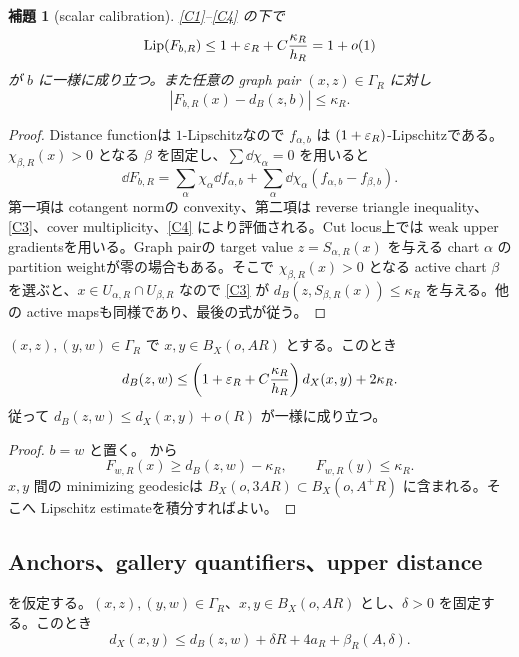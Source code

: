 \documentclass[11pt,a4paper]{ltjsarticle}
\theoremstyle{plain}
\newtheorem{lemma}[theorem]{補題}\newtheorem{corollary}[theorem]{系}
\theoremstyle{definition}
\theoremstyle{remark}
\begin{document}
\begin{lemma}[scalar calibration]\label{lem:scalar-calibration}
\ref{C1}--\ref{C4} の下で
\[
 \operatorname{Lip}(F_{b,R})\le1+\varepsilon_R+C\frac{\kappa_R}{h_R}=1+o(1)
\]
が $b$ に一様に成り立つ。また任意の graph pair $(x,z)\in\Gamma_R$ に対し
\[
 |F_{b,R}(x)-d_B(z,b)|\le\kappa_R.
\]
\end{lemma}

\begin{proof}
Distance functionは $1$-Lipschitzなので $f_{\alpha,b}$ は $(1+\varepsilon_R)$-Lipschitzである。$\chi_{\beta,R}(x)>0$ となる $\beta$ を固定し、$\sum\dd\chi_\alpha=0$ を用いると
\[
 \dd F_{b,R}=\sum_\alpha\chi_\alpha\dd f_{\alpha,b}
 +\sum_\alpha\dd\chi_\alpha(f_{\alpha,b}-f_{\beta,b}).
\]
第一項は cotangent normの convexity、第二項は reverse triangle inequality、\ref{C3}、cover multiplicity、\ref{C4} により評価される。Cut locus上では weak upper gradientsを用いる。Graph pairの target value $z=S_{\alpha,R}(x)$ を与える chart $\alpha$ の partition weightが零の場合もある。そこで $\chi_{\beta,R}(x)>0$ となる active chart $\beta$ を選ぶと、$x\in U_{\alpha,R}\cap U_{\beta,R}$ なので \ref{C3} が $d_B(z,S_{\beta,R}(x))\le\kappa_R$ を与える。他の active mapsも同様であり、最後の式が従う。
\end{proof}

\begin{proposition}\label{prop:calibrated-lower}
$(x,z),(y,w)\in\Gamma_R$ で $x,y\in B_X(o,AR)$ とする。このとき
\[
 d_B(z,w)\le
 \left(1+\varepsilon_R+C\frac{\kappa_R}{h_R}\right)d_X(x,y)+2\kappa_R.
\]
従って $d_B(z,w)\le d_X(x,y)+o(R)$ が一様に成り立つ。
\end{proposition}

\begin{proof}
$b=w$ と置く。 から
\[
 F_{w,R}(x)\ge d_B(z,w)-\kappa_R,\qquad F_{w,R}(y)\le\kappa_R.
\]
$x,y$ 間の minimizing geodesicは $B_X(o,3AR)\subset B_X(o,A^+R)$ に含まれる。そこへ Lipschitz estimateを積分すればよい。
\end{proof}

\subsection{Anchors、gallery quantifiers、upper distance}
\begin{proposition}\label{prop:gallery-upper}
 を仮定する。$(x,z),(y,w)\in\Gamma_R$、$x,y\in B_X(o,AR)$ とし、$\delta>0$ を固定する。このとき
\[
 d_X(x,y)\le d_B(z,w)+\delta R+4a_R+\beta_R(A,\delta).
\]
\end{proposition}
\end{document}

